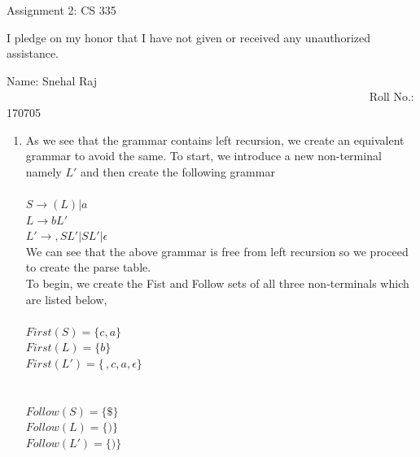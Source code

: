 \documentclass[10pt]{letter}
\begin{document}
\begin{center}
Assignment 2: CS 335
\end{center}

I pledge on my honor that I have not given or received any unauthorized assistance.

Name: Snehal Raj   ~~~~~~~~~~~~~~~~~~~~~~~~~~~~~~~~~~~~~~~~~~~~~~~~~~~~~~~~~~~~~~~   Roll No.:  170705     \\



\begin{enumerate}
\item 
As we see that the grammar contains left recursion, we create an equivalent grammar to avoid the same. To start, we introduce a new non-terminal namely $L'$ and then create the following grammar\\
\\
$S \rightarrow (L)|a$\\
$L \rightarrow bL'$\\
$L' \rightarrow ,SL'|SL'|\epsilon$\\

We can see that the above grammar is free from left recursion so we proceed to create the parse table. \\

To begin, we create the Fist and Follow sets of all three non-terminals which are listed below,\\
\\
$First(S) = \{c,a\}$\\
$First(L) = \{b\}$\\
$First(L') = \{ \, ,c,a,\epsilon\}$\\
\\
\\
$Follow(S) = \{\$\}$\\
$Follow(L) = \{)\}$\\
$Follow(L') = \{)\}$\\


\end{enumerate}
\end{document}

